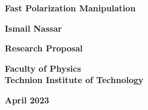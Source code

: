 \thispagestyle{empty}
\begin{center}
\Large

\textbf{Fast Polarization Manipulation}

\vspace{2.0in}

\textbf{Ismail Nassar}

\vspace{1.5in}

\textbf{Research Proposal}

\vspace{0.5in}

\textbf{Faculty of Physics}\\
\textbf{Technion Institute of Technology}



\textbf{April 2023}
\end{center}